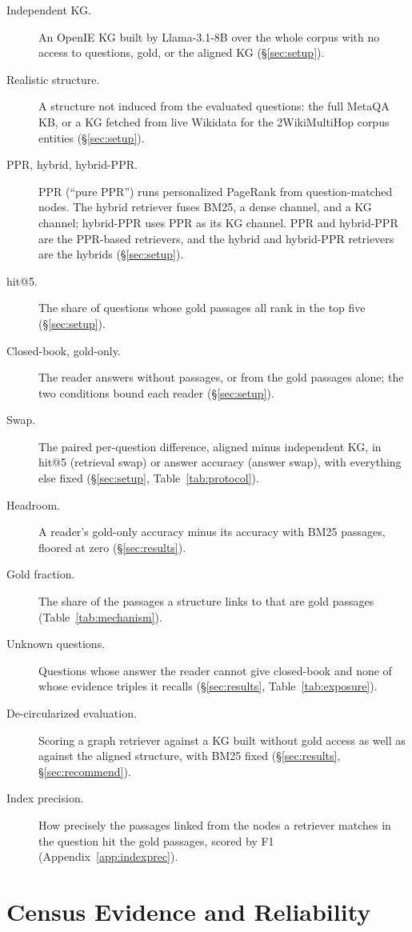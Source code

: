 \documentclass[11pt]{article}
\begin{document}
{\begin{description}
\item[Independent KG.] An OpenIE KG built by Llama-3.1-8B over the whole corpus with no access to questions, gold, or the aligned KG (\S\ref{sec:setup}).
\item[Realistic structure.] A structure not induced from the evaluated questions: the full MetaQA KB, or a KG fetched from live Wikidata for the 2WikiMultiHop corpus entities (\S\ref{sec:setup}).
\item[PPR, hybrid, hybrid-PPR.] PPR (``pure PPR'') runs personalized PageRank from question-matched nodes. The hybrid retriever fuses BM25, a dense channel, and a KG channel; hybrid-PPR uses PPR as its KG channel. PPR and hybrid-PPR are the PPR-based retrievers, and the hybrid and hybrid-PPR retrievers are the hybrids (\S\ref{sec:setup}).
\item[hit@5.] The share of questions whose gold passages all rank in the top five (\S\ref{sec:setup}).
\item[Closed-book, gold-only.] The reader answers without passages, or from the gold passages alone; the two conditions bound each reader (\S\ref{sec:setup}).
\item[Swap.] The paired per-question difference, aligned minus independent KG, in hit@5 (retrieval swap) or answer accuracy (answer swap), with everything else fixed (\S\ref{sec:setup}, Table~\ref{tab:protocol}).
\item[Headroom.] A reader's gold-only accuracy minus its accuracy with BM25 passages, floored at zero (\S\ref{sec:results}).
\item[Gold fraction.] The share of the passages a structure links to that are gold passages (Table~\ref{tab:mechanism}).
\item[Unknown questions.] Questions whose answer the reader cannot give closed-book and none of whose evidence triples it recalls (\S\ref{sec:results}, Table~\ref{tab:exposure}).
\item[De-circularized evaluation.] Scoring a graph retriever against a KG built without gold access as well as against the aligned structure, with BM25 fixed (\S\ref{sec:results}, \S\ref{sec:recommend}).
\item[Index precision.] How precisely the passages linked from the nodes a retriever matches in the question hit the gold passages, scored by F1 (Appendix~\ref{app:indexprec}).
\end{description}}

\section{Census Evidence and Reliability}
\end{document}
